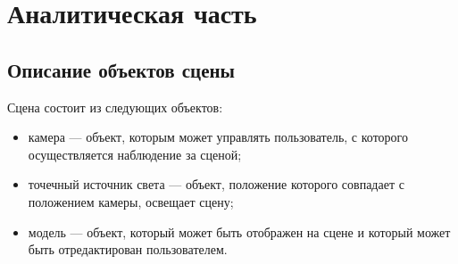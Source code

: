 \chapter{Аналитическая часть}
\section{Описание объектов сцены}

Сцена состоит из следующих объектов:
\begin{itemize}
	\item камера --- объект, которым может управлять пользователь, с которого осуществляется наблюдение за сценой;
	\item точечный источник света --- объект, положение которого совпадает с положением камеры, освещает сцену;
	\item модель --- объект, который может быть отображен на сцене и который может быть отредактирован пользователем.
\end{itemize}

